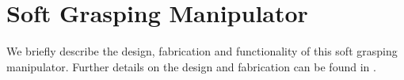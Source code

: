 \section{Soft Grasping Manipulator}
\label{sec:soft_grasping_manipulator}
We briefly describe the design, fabrication and functionality of this soft grasping manipulator. Further details on the design and fabrication can be found in \cite{marchese2015recipe}.

